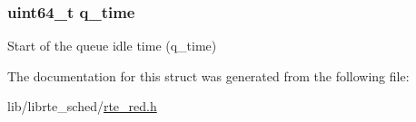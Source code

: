 \subsubsection[{q\+\_\+time}]{\setlength{\rightskip}{0pt plus 5cm}uint64\+\_\+t q\+\_\+time}\label{structrte__red_a6de3a741e3ef25f5807a54792bbb3ac2}
Start of the queue idle time (q\+\_\+time) 

The documentation for this struct was generated from the following file\+:\begin{DoxyCompactItemize}
\item 
lib/librte\+\_\+sched/\hyperlink{rte__red_8h}{rte\+\_\+red.\+h}\end{DoxyCompactItemize}
